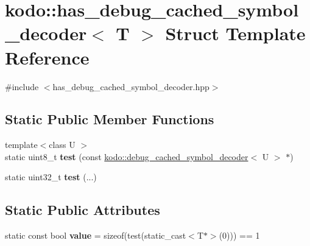 \hypertarget{structkodo_1_1has__debug__cached__symbol__decoder}{\section{kodo\-:\-:has\-\_\-debug\-\_\-cached\-\_\-symbol\-\_\-decoder$<$ T $>$ Struct Template Reference}
\label{structkodo_1_1has__debug__cached__symbol__decoder}
}


{\ttfamily \#include $<$has\-\_\-debug\-\_\-cached\-\_\-symbol\-\_\-decoder.\-hpp$>$}

\subsection*{Static Public Member Functions}
\begin{DoxyCompactItemize}
\item 
\hypertarget{structkodo_1_1has__debug__cached__symbol__decoder_a8904776e33bac37cc0ff6d51b7a52271}{{\footnotesize template$<$class U $>$ }\\static uint8\-\_\-t {\bfseries test} (const \hyperlink{classkodo_1_1debug__cached__symbol__decoder}{kodo\-::debug\-\_\-cached\-\_\-symbol\-\_\-decoder}$<$ U $>$ $\ast$)}\label{structkodo_1_1has__debug__cached__symbol__decoder_a8904776e33bac37cc0ff6d51b7a52271}

\item 
\hypertarget{structkodo_1_1has__debug__cached__symbol__decoder_a908632a4b91b5af1d583942b8fd531cf}{static uint32\-\_\-t {\bfseries test} (...)}\label{structkodo_1_1has__debug__cached__symbol__decoder_a908632a4b91b5af1d583942b8fd531cf}

\end{DoxyCompactItemize}
\subsection*{Static Public Attributes}
\begin{DoxyCompactItemize}
\item 
\hypertarget{structkodo_1_1has__debug__cached__symbol__decoder_adbc9869b03ea8184e0f134faa8ce2069}{static const bool {\bfseries value} = sizeof(test(static\-\_\-cast$<$T$\ast$$>$(0))) == 1}\label{structkodo_1_1has__debug__cached__symbol__decoder_adbc9869b03ea8184e0f134faa8ce2069}

\end{DoxyCompactItemize}


